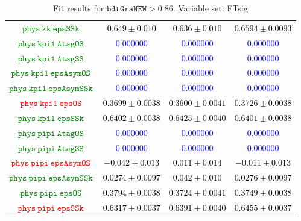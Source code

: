 \documentclass[10pt,a4paper]{article}
\begin{document}
\begin{table}[h!]
{\begin{tabular}{cccc}
\textcolor{Green}{$\mathtt{phys~kk~epsSSk~}$} & \textcolor{black}{$0.649 \pm 0.010$}& \textcolor{black}{$0.636 \pm 0.010$}& \textcolor{black}{$0.6594 \pm 0.0093$}\\
\textcolor{Green}{$\mathtt{phys~kpi1~AtagOS~}$} & \textcolor{blue}{$0.000000$}& \textcolor{blue}{$0.000000$}& \textcolor{blue}{$0.000000$}\\
\textcolor{Green}{$\mathtt{phys~kpi1~AtagSS~}$} & \textcolor{blue}{$0.000000$}& \textcolor{blue}{$0.000000$}& \textcolor{blue}{$0.000000$}\\
\textcolor{Green}{$\mathtt{phys~kpi1~epsAsymOS~}$} & \textcolor{blue}{$0.000000$}& \textcolor{blue}{$0.000000$}& \textcolor{blue}{$0.000000$}\\
\textcolor{Green}{$\mathtt{phys~kpi1~epsAsymSSk~}$} & \textcolor{blue}{$0.000000$}& \textcolor{blue}{$0.000000$}& \textcolor{blue}{$0.000000$}\\
\textcolor{red}{$\mathtt{phys~kpi1~epsOS~}$} & \textcolor{black}{$0.3699 \pm 0.0038$}& \textcolor{black}{$0.3600 \pm 0.0041$}& \textcolor{black}{$0.3726 \pm 0.0038$}\\
\textcolor{Green}{$\mathtt{phys~kpi1~epsSSk~}$} & \textcolor{black}{$0.6402 \pm 0.0038$}& \textcolor{black}{$0.6425 \pm 0.0040$}& \textcolor{black}{$0.6401 \pm 0.0038$}\\
\textcolor{Green}{$\mathtt{phys~pipi~AtagOS~}$} & \textcolor{blue}{$0.000000$}& \textcolor{blue}{$0.000000$}& \textcolor{blue}{$0.000000$}\\
\textcolor{Green}{$\mathtt{phys~pipi~AtagSS~}$} & \textcolor{blue}{$0.000000$}& \textcolor{blue}{$0.000000$}& \textcolor{blue}{$0.000000$}\\
\textcolor{red}{$\mathtt{phys~pipi~epsAsymOS~}$} & \textcolor{black}{$-0.042 \pm 0.013$}& \textcolor{black}{$0.011 \pm 0.014$}& \textcolor{black}{$-0.011 \pm 0.013$}\\
\textcolor{Green}{$\mathtt{phys~pipi~epsAsymSSk~}$} & \textcolor{black}{$0.0274 \pm 0.0097$}& \textcolor{black}{$0.042 \pm 0.010$}& \textcolor{black}{$0.0276 \pm 0.0097$}\\
\textcolor{Green}{$\mathtt{phys~pipi~epsOS~}$} & \textcolor{black}{$0.3794 \pm 0.0038$}& \textcolor{black}{$0.3724 \pm 0.0041$}& \textcolor{black}{$0.3749 \pm 0.0038$}\\
\textcolor{red}{$\mathtt{phys~pipi~epsSSk~}$} & \textcolor{black}{$0.6317 \pm 0.0037$}& \textcolor{black}{$0.6391 \pm 0.0040$}& \textcolor{black}{$0.6455 \pm 0.0037$}\\
\hline
\end{tabular}
}
\caption{Fit results for $\mathtt{bdtGraNEW}> 0.86$.
        Variable set: FTsig}
\label{tab:GraNEW_0.86_FTsig}
\end{table}
\end{document}
